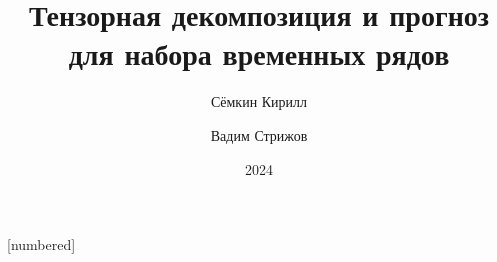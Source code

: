
\usepackage[justification=centering, font=footnotesize]{caption}
[numbered]

\newcommand{\delayV}[1]{\overset{\leftarrow}{\textbf{x}}_{#1}}
\newcommand{\delayM}[1]{\overset{\leftarrow}{\mathbf{X}}_{#1}}

\theoremstyle{definition}
\newtheorem*{Def}{Определение}

\usepackage{grffile}

\setlength{\parskip}{0.1cm}

\date{2024}
\title{Тензорная декомпозиция и прогноз для набора временных рядов}
\author{Сёмкин Кирилл   \and Вадим Стрижов }


	
	\begin{frame}[c]
		\titlepage
	\end{frame}

